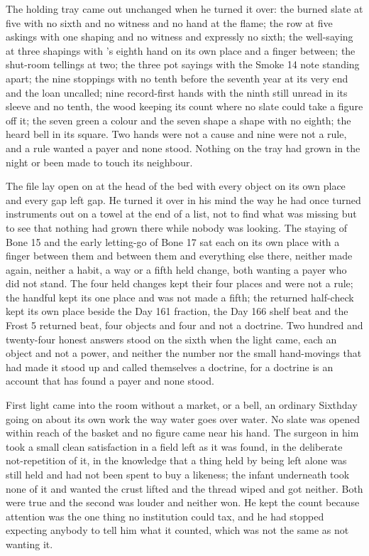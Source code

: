 The holding tray came out unchanged when he turned it over: the burned slate at five with no sixth and no witness and no hand at the flame; the row at five askings with one shaping and no witness and expressly no sixth; the well-saying at three shapings with 's eighth hand on its own place and a finger between; the shut-room tellings at two; the three pot sayings with the Smoke 14 note standing apart; the nine stoppings with no tenth before the seventh year at its very end and the loan uncalled; nine record-first hands with the ninth still unread in its sleeve and no tenth, the wood keeping its count where no slate could take a figure off it; the seven green a colour and the seven shape a shape with no eighth; the heard bell in its square. Two hands were not a cause and nine were not a rule, and a rule wanted a payer and none stood. Nothing on the tray had grown in the night or been made to touch its neighbour.

The file lay open on  at the head of the bed with every object on its own place and every gap left gap. He turned it over in his mind the way he had once turned instruments out on a towel at the end of a list, not to find what was missing but to see that nothing had grown there while nobody was looking. The staying of Bone 15 and the early letting-go of Bone 17 sat each on its own place with a finger between them and between them and everything else there, neither made again, neither a habit, a way or a fifth held change, both wanting a payer who did not stand. The four held changes kept their four places and were not a rule; the handful kept its one place and was not made a fifth; the returned half-check kept its own place beside the Day 161 fraction, the Day 166 shelf beat and the Frost 5 returned beat, four objects and four and not a doctrine. Two hundred and twenty-four honest answers stood on the sixth when the light came, each an object and not a power, and neither the number nor the small hand-movings that had made it stood up and called themselves a doctrine, for a doctrine is an account that has found a payer and none stood.

First light came into the room without a market,  or a bell, an ordinary Sixthday going on about its own work the way water goes over water. No slate was opened within reach of the basket and no figure came near his hand. The surgeon in him took a small clean satisfaction in a field left as it was found, in the deliberate not-repetition of it, in the knowledge that a thing held by being left alone was still held and had not been spent to buy a likeness; the infant underneath took none of it and wanted the crust lifted and the thread wiped and got neither. Both were true and the second was louder and neither won. He kept the count because attention was the one thing no institution could tax, and he had stopped expecting anybody to tell him what it counted, which was not the same as not wanting it.

